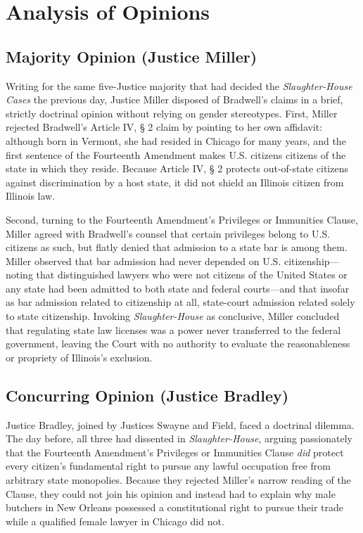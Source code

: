 \documentclass[12pt]{article}
\begin{document}
\section{Analysis of Opinions}

\subsection{Majority Opinion (Justice Miller)}

Writing for the same five-Justice majority that had decided the \textit{Slaughter-House Cases} the previous day, Justice Miller disposed of Bradwell's claims in a brief, strictly doctrinal opinion without relying on gender stereotypes. First, Miller rejected Bradwell's Article IV, \S{} 2 claim by pointing to her own affidavit: although born in Vermont, she had resided in Chicago for many years, and the first sentence of the Fourteenth Amendment makes U.S. citizens citizens of the state in which they reside. Because Article IV, \S{} 2 protects out-of-state citizens against discrimination by a host state, it did not shield an Illinois citizen from Illinois law.

Second, turning to the Fourteenth Amendment's Privileges or Immunities Clause, Miller agreed with Bradwell's counsel that certain privileges belong to U.S. citizens as such, but flatly denied that admission to a state bar is among them. Miller observed that bar admission had never depended on U.S. citizenship---noting that distinguished lawyers who were not citizens of the United States or any state had been admitted to both state and federal courts---and that insofar as bar admission related to citizenship at all, state-court admission related solely to state citizenship. Invoking \textit{Slaughter-House} as conclusive, Miller concluded that regulating state law licenses was a power never transferred to the federal government, leaving the Court with no authority to evaluate the reasonableness or propriety of Illinois's exclusion.

\subsection{Concurring Opinion (Justice Bradley)}

Justice Bradley, joined by Justices Swayne and Field, faced a doctrinal dilemma. The day before, all three had dissented in \textit{Slaughter-House}, arguing passionately that the Fourteenth Amendment's Privileges or Immunities Clause \textit{did} protect every citizen's fundamental right to pursue any lawful occupation free from arbitrary state monopolies. Because they rejected Miller's narrow reading of the Clause, they could not join his opinion and instead had to explain why male butchers in New Orleans possessed a constitutional right to pursue their trade while a qualified female lawyer in Chicago did not.
\end{document}
